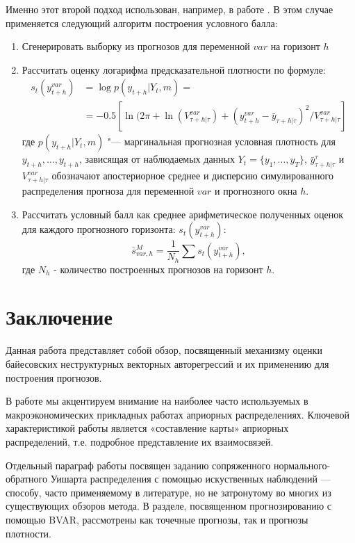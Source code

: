 \documentclass[11pt]{article} %
\begin{document}
Именно этот второй подход использован, например, в работе \cite{carriero_al_2015}. В этом случае применяется следующий алгоритм  построения условного балла:
\begin{enumerate}
\item Сгенерировать выборку из прогнозов для переменной $var$ на горизонт $h$
\item Рассчитать оценку логарифма предсказательной плотности по формуле:
\begin{align}
s_t\left(y_{t+h}^{var}\right) &=\log p(y_{t+h}|Y_t,m)=\\
&=-0.5\left[ \ln(2\pi+\ln(V^{var}_{\tau+h|\tau})+(y_{t+h}^{var}-\bar y_{\tau+h|\tau})^2/V_{\tau+h|\tau}^{var} \right]
\end{align}
 где $p(y_{t+h}|Y_t,m)$ "--- маргинальная прогнозная условная плотность для $y_{t+h},\ldots,y_{t+h}$, зависящая от наблюдаемых данных $Y_t=\lbrace{y_1,\ldots,y_T\rbrace}$,  $\bar y_{\tau+h|\tau}^{\tau}$ и $V_{\tau+h|\tau}^{var}$ обозначают апостериорное среднее и дисперсию симулированного распределения прогноза для переменной $var$ и прогнозного окна $h$.
\item Рассчитать условный балл как среднее арифметическое полученных оценок для каждого прогнозного горизонта:
$s_t\left(y_{t+h}^{var}\right)$:
\begin{equation}
\bar s_{var,h}^{M}=\frac{1}{N_h}\sum s_t\left(y_{t+h}^{var}\right),
\end{equation}
где $N_h$ - количество построенных прогнозов на горизонт $h$.
\end{enumerate}

\section{Заключение}

Данная работа представляет собой обзор, посвященный механизму оценки байесовских неструктурных векторных авторегрессий и их применению для построения прогнозов.

В работе мы акцентируем внимание  на наиболее часто используемых в макроэкономических прикладных работах априорных распределениях. Ключевой характеристикой работы является «составление карты»  априорных распределений, т.е. подробное представление их взаимосвязей.

Отдельный параграф работы посвящен заданию сопряженного нормального-обратного Уишарта распределения с помощью искуственных наблюдений --- способу, часто применяемому в литературе, но не затронутому во многих из существующих обзоров метода. В разделе, посвященном прогнозированию с помощью BVAR, рассмотрены как точечные прогнозы, так и прогнозы плотности.
\end{document}

